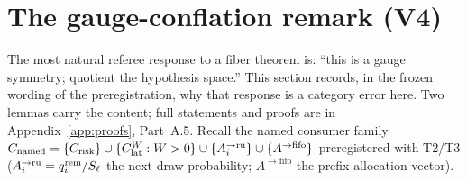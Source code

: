 \section{The gauge-conflation remark (V4)}
\label{sec:v4}

The most natural referee response to a fiber theorem is: ``this is a gauge
symmetry; quotient the hypothesis space.'' This section records, in the
frozen wording of the preregistration, why that response is a category
error here. Two lemmas carry the content; full statements and proofs are in
Appendix~\ref{app:proofs}, Part~A.5. Recall the named consumer family
$C_{\mathrm{named}} = \{\Crisk\} \cup \{\Clat[W] : W > 0\} \cup \{A^{\to\ru}_i\} \cup
\{A^{\to\mathrm{fifo}}\}$ preregistered with T2/T3 ($A^{\to\ru}_i = q_i^{\mathrm{rem}}
/ S_\ell$ the next-draw probability; $A^{\to\mathrm{fifo}}$ the prefix allocation
vector).

